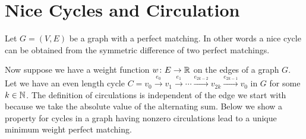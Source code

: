 \section{Nice Cycles and Circulation}
Let $G=(V,E)$ be a graph with a perfect matching. 
\parinf In other words a nice cycle can be obtained from the symmetric difference of two perfect matchings.\parinn

Now suppose we have a weight function $w\colon E\to \mathbb{R}$ on the edges of a graph $G$. Let we have an even length cycle $C=v_0\overset{e_0}{\longrightarrow}v_1\overset{e_1}{\longrightarrow}\cdots \overset{e_{2k-2}}{\longrightarrow}v_{2k}\overset{e_{2k-1}}{\longrightarrow}v_0$ in $G$ for some $k\in \mathbb{N}$.
The definition of circulations is independent of the edge we start with because we take the absolute value of the alternating sum. Below we show a property for cycles in a graph having nonzero circulations lead to a unique minimum weight perfect matching.

%
